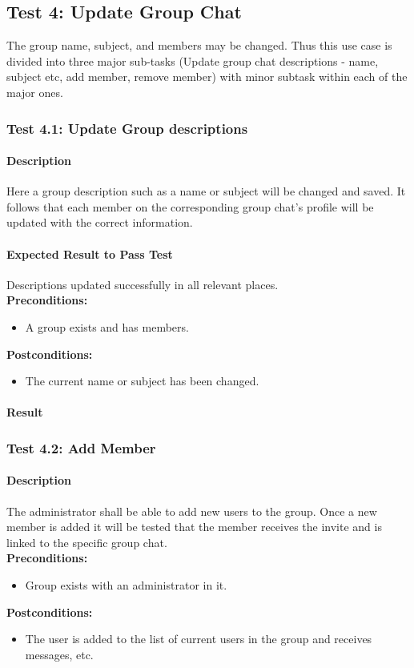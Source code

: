 \documentclass[11pt]{article}
\begin{document}
\subsection{Test 4: Update Group Chat}
The group name, subject, and members may be changed. Thus this use case is divided into three major sub-tasks (Update group chat descriptions - name, subject etc, add member, remove member) with minor subtask within each of the major ones.
\subsubsection{Test 4.1: Update Group descriptions}
\paragraph{Description} Here a group description such as a name or subject will be changed and saved. It follows that each member on the corresponding group chat's profile will be updated with the correct information.
\paragraph{Expected Result to Pass Test}
Descriptions updated successfully in all relevant places.\\
\textbf{Preconditions:} 
\begin{itemize}
\item A group exists and has members.
\end{itemize}
\textbf{Postconditions:}
\begin{itemize}
\item The current name or subject has been changed.
\end{itemize}
\paragraph{Result}

\subsubsection{Test 4.2: Add Member}
\paragraph{Description}
The administrator shall be able to add new users to the group. Once a new member is added it will be tested that the member receives the invite and is linked to the specific group chat.\\
\textbf{Preconditions:} 
\begin{itemize}
\item Group exists with an administrator in it.
\end{itemize}
\textbf{Postconditions:}
\begin{itemize}
\item The user is added to the list of current users in the group and receives messages, etc.
\end{itemize}
\end{document}
